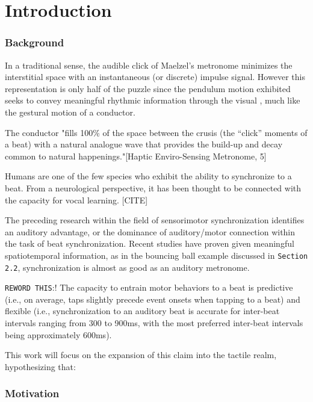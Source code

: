 
\chapter{Introduction} \label{secIntro}

\subsection{Background}
In a traditional sense, the audible click of Maelzel's metronome minimizes the interstitial space with an instantaneous (or discrete) impulse signal. However this representation is only half of the puzzle since the pendulum motion exhibited seeks to convey meaningful rhythmic information through the visual , much like the gestural motion of a conductor.

The conductor "fills 100\% of the space between the crusis (the “click” moments of a beat) with a natural analogue wave that provides the build-up and decay common to natural happenings."[Haptic Enviro-Sensing Metronome, 5]

Humans are one of the few species who exhibit the ability to synchronize to a beat. From a neurological perspective, it has been thought to be connected with the capacity for vocal learning. [CITE]

The preceding research within the field of sensorimotor synchronization identifies an auditory advantage, or the dominance of auditory/motor connection within the task of beat synchronization. Recent studies have proven given meaningful spatiotemporal information, as in the bouncing ball example discussed in \verb!Section 2.2!, synchronization is almost as good as an auditory metronome.

\verb!REWORD THIS!:!
The capacity to entrain motor behaviors to a beat is predictive (i.e., on average, taps slightly precede event onsets when tapping to a beat) and flexible (i.e., synchronization to an auditory beat is accurate for inter-beat intervals ranging from 300 to 900ms, with the most preferred inter-beat intervals being approximately 600ms).~\cite{repp2013sensorimotor}

This work will focus on the expansion of this claim into the tactile realm, hypothesizing that:

\subsection{Motivation}


